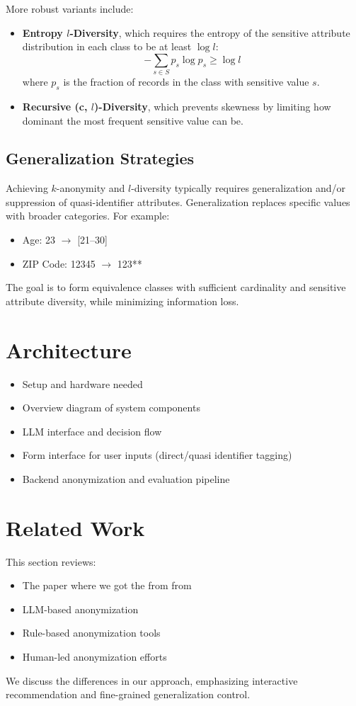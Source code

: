 \documentclass{article}
\begin{document}
More robust variants include:
\begin{itemize}
\item \textbf{Entropy $l$-Diversity}, which requires the entropy of the sensitive attribute distribution in each class to be at least $\log l$:
$$
-\sum_{s \in S} p_s \log p_s \geq \log l
$$
where $p_s$ is the fraction of records in the class with sensitive value $s$.

\item \textbf{Recursive (c, $l$)-Diversity}, which prevents skewness by limiting how dominant the most frequent sensitive value can be.
\end{itemize}

\subsection{Generalization Strategies}

Achieving $k$-anonymity and $l$-diversity typically requires generalization and/or suppression of quasi-identifier attributes. Generalization replaces specific values with broader categories. For example:
\begin{itemize}
\item Age: 23 $\rightarrow$ [21--30]
\item ZIP Code: 12345 $\rightarrow$ 123**
\end{itemize}

The goal is to form equivalence classes with sufficient cardinality and sensitive attribute diversity, while minimizing information loss.


\section{Architecture}
\begin{itemize}
    \item Setup and hardware needed
    \item Overview diagram of system components
    \item LLM interface and decision flow
    \item Form interface for user inputs (direct/quasi identifier tagging)
    \item Backend anonymization and evaluation pipeline
\end{itemize}

\section{Related Work}
This section reviews:
\begin{itemize}
     \item The paper where we got the from from
    \item LLM-based anonymization
    \item Rule-based anonymization tools
    \item Human-led anonymization efforts
\end{itemize}
We discuss the differences in our approach, emphasizing interactive recommendation and fine-grained generalization control.
\end{document}
